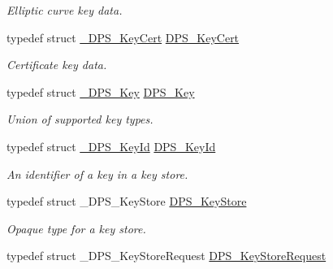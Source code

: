 \begin{DoxyCompactItemize}
\begin{DoxyCompactList}\small\item\em Elliptic curve key data. \end{DoxyCompactList}\item 
typedef struct \hyperlink{struct___d_p_s___key_cert}{\+\_\+\+D\+P\+S\+\_\+\+Key\+Cert} \hyperlink{group__keystore_ga98b6701b118cab76965736ad720f9bcf}{D\+P\+S\+\_\+\+Key\+Cert}
\begin{DoxyCompactList}\small\item\em Certificate key data. \end{DoxyCompactList}\item 
\mbox{\label{group__keystore_gaa56a1429b6a1658e674eea558bdbbfc0}} 
typedef struct \hyperlink{struct___d_p_s___key}{\+\_\+\+D\+P\+S\+\_\+\+Key} \hyperlink{group__keystore_gaa56a1429b6a1658e674eea558bdbbfc0}{D\+P\+S\+\_\+\+Key}
\begin{DoxyCompactList}\small\item\em Union of supported key types. \end{DoxyCompactList}\item 
\mbox{\label{group__keystore_ga4345e29dd2ad5d7fd88a1e988787bd72}} 
typedef struct \hyperlink{struct___d_p_s___key_id}{\+\_\+\+D\+P\+S\+\_\+\+Key\+Id} \hyperlink{group__keystore_ga4345e29dd2ad5d7fd88a1e988787bd72}{D\+P\+S\+\_\+\+Key\+Id}
\begin{DoxyCompactList}\small\item\em An identifier of a key in a key store. \end{DoxyCompactList}\item 
\mbox{\label{group__keystore_gaf3833cfe48f848f698514bc5daa075fa}} 
typedef struct \+\_\+\+D\+P\+S\+\_\+\+Key\+Store \hyperlink{group__keystore_gaf3833cfe48f848f698514bc5daa075fa}{D\+P\+S\+\_\+\+Key\+Store}
\begin{DoxyCompactList}\small\item\em Opaque type for a key store. \end{DoxyCompactList}\item 
\mbox{\label{group__keystore_ga7c3e50965b65334e9791780fa855ed16}} 
typedef struct \+\_\+\+D\+P\+S\+\_\+\+Key\+Store\+Request \hyperlink{group__keystore_ga7c3e50965b65334e9791780fa855ed16}{D\+P\+S\+\_\+\+Key\+Store\+Request}

\end{DoxyCompactItemize}

